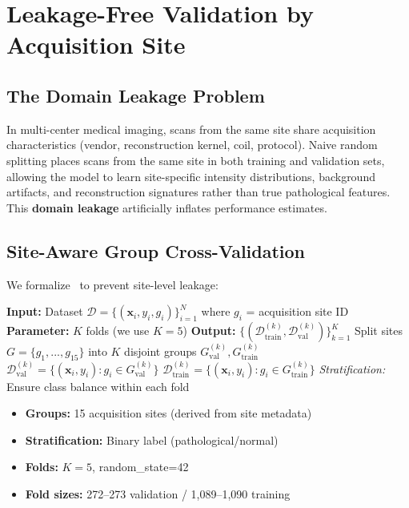 \section{Leakage-Free Validation by Acquisition Site}
\label{sec:leakage}

\subsection{The Domain Leakage Problem}
\label{sec:leakage_problem}

In multi-center medical imaging, scans from the same site share acquisition characteristics (vendor, reconstruction kernel, coil, protocol). Naive random splitting places scans from the same site in both training and validation sets, allowing the model to learn site-specific intensity distributions, background artifacts, and reconstruction signatures rather than true pathological features. This \textbf{domain leakage} artificially inflates performance estimates.

\subsection{Site-Aware Group Cross-Validation}
\label{sec:group_cv}

We formalize \cvname~to prevent site-level leakage:

\begin{algorithm}[H]
\caption{Site-Aware Stratified Group K-Fold}
\begin{algorithmic}
\STATE \textbf{Input:} Dataset $\mathcal{D} = \{(\mathbf{x}_i, y_i, g_i)\}_{i=1}^N$ where $g_i$ = acquisition site ID
\STATE \textbf{Parameter:} $K$ folds (we use $K=5$)
\STATE \textbf{Output:} $\{(\mathcal{D}_{\text{train}}^{(k)}, \mathcal{D}_{\text{val}}^{(k)})\}_{k=1}^K$
    \STATE Split sites $G = \{g_1, ..., g_{15}\}$ into $K$ disjoint groups $G^{(k)}_{\text{val}}, G^{(k)}_{\text{train}}$
    \STATE $\mathcal{D}_{\text{val}}^{(k)} = \{(\mathbf{x}_i, y_i) : g_i \in G^{(k)}_{\text{val}}\}$
    \STATE $\mathcal{D}_{\text{train}}^{(k)} = \{(\mathbf{x}_i, y_i) : g_i \in G^{(k)}_{\text{train}}\}$
    \STATE \textit{Stratification:} Ensure class balance within each fold
\ENDFOR
\end{algorithmic}
\end{algorithm}

\begin{itemize}
    \item \textbf{Groups:} 15 acquisition sites (derived from site metadata)
    \item \textbf{Stratification:} Binary label (pathological/normal)
    \item \textbf{Folds:} $K=5$, random\_state=42
    \item \textbf{Fold sizes:} 272--273 validation / 1,089--1,090 training
\end{itemize}

